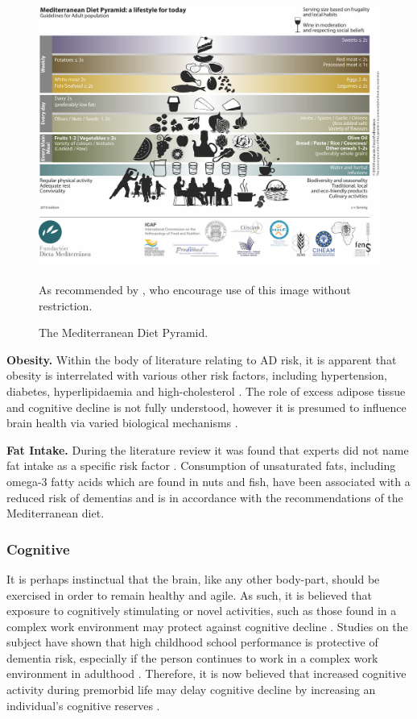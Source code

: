 \begin{figure}[h]
    \centering
    \includegraphics[scale=0.3, angle=0]{Files/prevention-study-1/figures/med-diet-pyramid-small}
    \caption{The Mediterranean Diet Pyramid.}
    \medskip
	\small
	As recommended by \cite{Bach-Faig2011}, who encourage use of this image without restriction.
    \label{fig: med-diet-pyramid}
\end{figure}

\textbf{Obesity.}
Within the body of literature relating to AD risk, it is apparent that obesity is interrelated with various other risk factors, including hypertension, diabetes, hyperlipidaemia and high-cholesterol \cite{Gustafson2012, Gustafson2008}. The role of excess adipose tissue and cognitive decline is not fully understood, however it is presumed to influence brain health via varied biological mechanisms \cite{Gustafson2012}.

\textbf{Fat Intake.}
During the literature review it was found that experts did not name fat intake as a specific risk factor \cite{Deckers2015}. Consumption of unsaturated fats, including omega-3 fatty acids which are found in nuts and fish, have been associated with a reduced risk of dementias \cite{Sydenham2012,Huhn2015} and is in accordance with the recommendations of the Mediterranean diet.

\subsubsection{Cognitive}
It is perhaps instinctual that the brain, like any other body-part, should be exercised in order to remain healthy and agile. As such, it is believed that exposure to cognitively stimulating or novel activities, such as those found in a complex work environment may protect against cognitive decline \cite{Roberts2014}. Studies on the subject have shown that high childhood school performance is protective of dementia risk, especially if the person continues to work in a complex work environment in adulthood \cite{Dekhtyar2015}. Therefore, it is now believed that increased cognitive activity during premorbid life may delay cognitive decline by increasing an individual’s cognitive reserves \cite{Sattler2012, Dekhtyar2015}.

